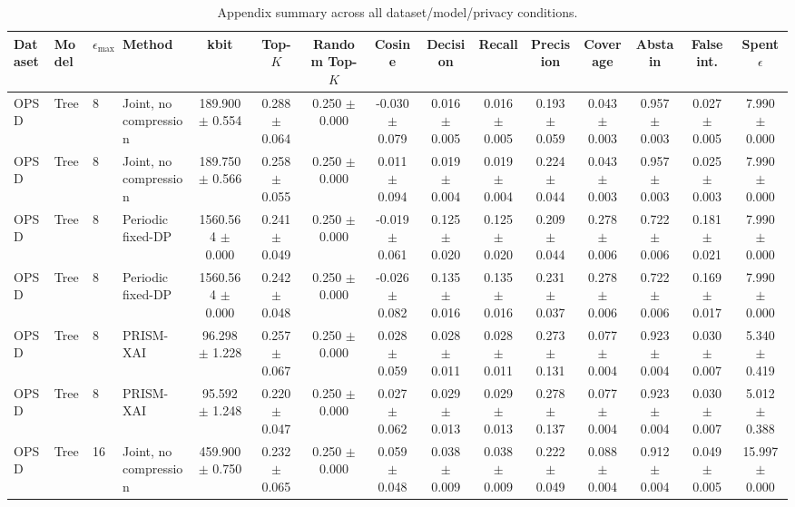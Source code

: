 \begin{table}[t]
\caption{Appendix summary across all dataset/model/privacy conditions.}
\label{tab:appendix-conditions}
\centering
\scriptsize
\setlength{\tabcolsep}{2.5pt}
\begin{tabular}{llllccccccccccc}
\toprule
Dataset & Model & $\epsilon_{\max}$ & Method & kbit & Top-$K$ & Random Top-$K$ & Cosine & Decision & Recall & Precision & Coverage & Abstain & False int. & Spent $\epsilon$ \\
\midrule
OPSD & Tree & 8 & Joint, no compression & 189.900 $\pm$ 0.554 & 0.288 $\pm$ 0.064 & 0.250 $\pm$ 0.000 & -0.030 $\pm$ 0.079 & 0.016 $\pm$ 0.005 & 0.016 $\pm$ 0.005 & 0.193 $\pm$ 0.059 & 0.043 $\pm$ 0.003 & 0.957 $\pm$ 0.003 & 0.027 $\pm$ 0.005 & 7.990 $\pm$ 0.000 \\
OPSD & Tree & 8 & Joint, no compression & 189.750 $\pm$ 0.566 & 0.258 $\pm$ 0.055 & 0.250 $\pm$ 0.000 & 0.011 $\pm$ 0.094 & 0.019 $\pm$ 0.004 & 0.019 $\pm$ 0.004 & 0.224 $\pm$ 0.044 & 0.043 $\pm$ 0.003 & 0.957 $\pm$ 0.003 & 0.025 $\pm$ 0.003 & 7.990 $\pm$ 0.000 \\
OPSD & Tree & 8 & Periodic fixed-DP & 1560.564 $\pm$ 0.000 & 0.241 $\pm$ 0.049 & 0.250 $\pm$ 0.000 & -0.019 $\pm$ 0.061 & 0.125 $\pm$ 0.020 & 0.125 $\pm$ 0.020 & 0.209 $\pm$ 0.044 & 0.278 $\pm$ 0.006 & 0.722 $\pm$ 0.006 & 0.181 $\pm$ 0.021 & 7.990 $\pm$ 0.000 \\
OPSD & Tree & 8 & Periodic fixed-DP & 1560.564 $\pm$ 0.000 & 0.242 $\pm$ 0.048 & 0.250 $\pm$ 0.000 & -0.026 $\pm$ 0.082 & 0.135 $\pm$ 0.016 & 0.135 $\pm$ 0.016 & 0.231 $\pm$ 0.037 & 0.278 $\pm$ 0.006 & 0.722 $\pm$ 0.006 & 0.169 $\pm$ 0.017 & 7.990 $\pm$ 0.000 \\
OPSD & Tree & 8 & PRISM-XAI & 96.298 $\pm$ 1.228 & 0.257 $\pm$ 0.067 & 0.250 $\pm$ 0.000 & 0.028 $\pm$ 0.059 & 0.028 $\pm$ 0.011 & 0.028 $\pm$ 0.011 & 0.273 $\pm$ 0.131 & 0.077 $\pm$ 0.004 & 0.923 $\pm$ 0.004 & 0.030 $\pm$ 0.007 & 5.340 $\pm$ 0.419 \\
OPSD & Tree & 8 & PRISM-XAI & 95.592 $\pm$ 1.248 & 0.220 $\pm$ 0.047 & 0.250 $\pm$ 0.000 & 0.027 $\pm$ 0.062 & 0.029 $\pm$ 0.013 & 0.029 $\pm$ 0.013 & 0.278 $\pm$ 0.137 & 0.077 $\pm$ 0.004 & 0.923 $\pm$ 0.004 & 0.030 $\pm$ 0.007 & 5.012 $\pm$ 0.388 \\
OPSD & Tree & 16 & Joint, no compression & 459.900 $\pm$ 0.750 & 0.232 $\pm$ 0.065 & 0.250 $\pm$ 0.000 & 0.059 $\pm$ 0.048 & 0.038 $\pm$ 0.009 & 0.038 $\pm$ 0.009 & 0.222 $\pm$ 0.049 & 0.088 $\pm$ 0.004 & 0.912 $\pm$ 0.004 & 0.049 $\pm$ 0.005 & 15.997 $\pm$ 0.000 \\

\end{tabular}
\end{table}
